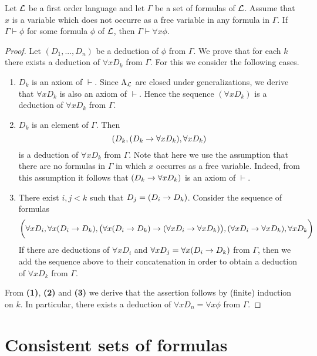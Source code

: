 \documentclass[10pt]{amsart}
\begin{document}
\begin{theorem}\label{theorem:generalization_rule}
	Let ${\mathcal L}$ be a first order language and let $\Gamma$ be a set of formulas of ${\mathcal L}$. Assume that $x$ is a variable which does not occurre as a free variable in any formula in $\Gamma$. If $\Gamma \vdash \phi$ for some formula $\phi$ of ${\mathcal L}$, then $\Gamma \vdash \forall x\phi$.
\end{theorem}
\begin{proof}
	Let $(D_1,...,D_n)$ be a deduction of $\phi$ from $\Gamma$. We prove that for each $k$ there exists a deduction of $\forall xD_k$ from $\Gamma$. For this we consider the following cases.
	\begin{enumerate}[label=\textbf{(\arabic*)}, leftmargin=3.0em]
		\item $D_k$ is an axiom of $\vdash$. Since $\Lambda_{{\mathcal L}}$ are closed under generalizations, we derive that $\forall xD_k$ is also an axiom of $\vdash$. Hence the sequence $(\forall xD_k)$ is a deduction of $\forall x D_k$ from $\Gamma$.
		\item $D_k$ is an element of $\Gamma$. Then
		      $$(D_k,(D_k \rightarrow \forall x D_k),\forall x D_k)$$
		      is a deduction of $\forall xD_k$ from $\Gamma$. Note that here we use the assumption that there are no formulas in $\Gamma$ in which $x$ occurres as a free variable. Indeed, from this assumption it follows that $(D_k \rightarrow \forall xD_k)$ is an axiom of $\vdash$.
		\item There exist $i, j < k$ such that $D_j = (D_i \rightarrow D_k)$. Consider the sequence of formulas
		      $$\bigg(\forall xD_i , \forall x (D_i \rightarrow D_k ) , \big(\forall x (D_i \rightarrow D_k ) \rightarrow (\forall xD_i \rightarrow \forall xD_k)\big) , (\forall xD_i \rightarrow \forall xD_k) , \forall xD_k\bigg)$$
		      If there are deductions of $\forall x D_i$ and $\forall xD_j = \forall x (D_i \rightarrow D_k)$ from $\Gamma$, then we add the sequence above to their concatenation in order to obtain a deduction of $\forall x D_k$ from $\Gamma$.
	\end{enumerate}
	From \textbf{(1)}, \textbf{(2)} and \textbf{(3)} we derive that the assertion follows by (finite) induction on $k$. In particular, there exists a deduction of $\forall x D_n = \forall x \phi$ from $\Gamma$.
\end{proof}

\section{Consistent sets of formulas}
\end{document}
